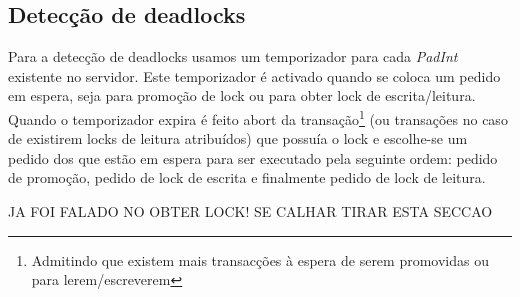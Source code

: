 \subsection{Detecção de deadlocks}

Para a detecção de deadlocks usamos um temporizador para cada \textit{PadInt} existente no servidor. Este temporizador é activado quando se coloca um pedido em espera, seja para promoção de lock ou para obter lock de escrita/leitura. Quando o temporizador expira é feito abort da transação\footnote{Admitindo que existem mais transacções à espera de serem promovidas ou para lerem/escreverem} (ou transações no caso de existirem locks de leitura atribuídos) que possuía o lock e escolhe-se um pedido dos que estão em espera para ser executado pela seguinte ordem: pedido de promoção, pedido de lock de escrita e finalmente pedido de lock de leitura.

JA FOI FALADO NO OBTER LOCK! SE CALHAR TIRAR ESTA SECCAO
